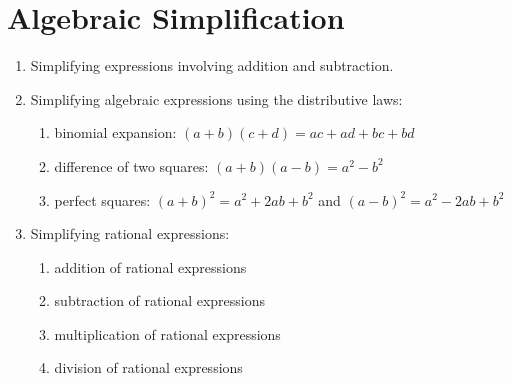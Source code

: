
\chapter{Algebraic Simplification}

\begin{enumerate}
\item Simplifying expressions involving addition and subtraction.

\item Simplifying algebraic expressions using the distributive laws:
  \begin{enumerate}
  \item binomial expansion: $(a + b)(c + d) = ac + ad + bc + bd$

  \item difference of two squares: $(a + b)(a - b) = a^2 - b^2$

  \item perfect squares: $(a + b)^2 = a^2 + 2ab + b^2$ and
    $(a - b)^2 = a^2 - 2ab + b^2$
  \end{enumerate}

\item Simplifying rational expressions:
  \begin{enumerate}
  \item addition of rational expressions

  \item subtraction of rational expressions

  \item multiplication of rational expressions

  \item division of rational expressions
  \end{enumerate}
\end{enumerate}
